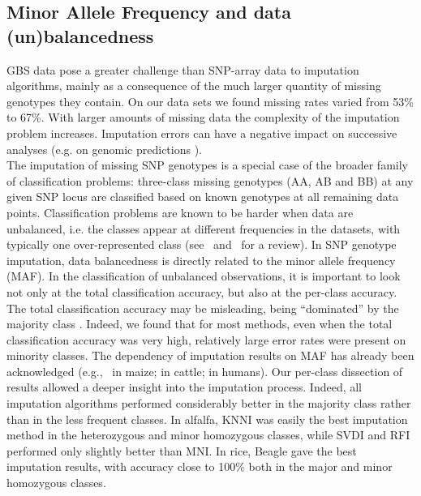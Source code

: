 \subsection{Minor Allele Frequency and data (un)balancedness}
\label{sec:maf}
GBS data pose a greater challenge than SNP-array data to imputation algorithms, mainly as a consequence of the much larger quantity of missing genotypes they contain. On our data sets we found missing rates varied from 53\% to 67\%. With larger amounts of missing data the complexity of the imputation problem increases. Imputation errors can have a negative impact on successive analyses (e.g. on genomic predictions \cite{rutkoski_imputation_2013,Annicchiarico2015}).\\
The imputation of missing SNP genotypes is a special case of the broader family of classification problems: three-class missing genotypes (AA, AB and BB) at any given SNP locus are classified based on known genotypes at all remaining data points. Classification problems are known to be harder when data are unbalanced, i.e. the classes appear at different frequencies in the datasets, with typically one over-represented class
(see~\cite{kotsiantis_handling_2006}
and~\cite{sun_classification_2009} for a review). In SNP genotype imputation, data balancedness is directly related to the minor allele frequency (MAF). In the classification of unbalanced observations, it is important to look not only at the total classification accuracy, but also at the per-class accuracy. The total classification accuracy may be misleading, being ``dominated'' by the majority class
\cite{he_learning_2009}.
Indeed, we found that for most methods, even when the total classification accuracy was very high, relatively large error rates were present on minority classes. 
The dependency of imputation results on MAF has already been acknowledged  (e.g.,~\cite{hickey_factors_2012} in maize; \cite{ma_comparison_2013} in cattle; \cite{pei_analyses_2008} in humans). Our per-class dissection of results allowed a deeper insight into the imputation process. Indeed, all imputation algorithms performed considerably better in the majority class rather than in the less frequent classes.
In alfalfa, KNNI was easily the best imputation method in the heterozygous and minor homozygous classes, while SVDI and RFI performed only slightly better than MNI. In rice, Beagle gave the best imputation results, with accuracy close to 100\% both in the major and minor homozygous classes.

